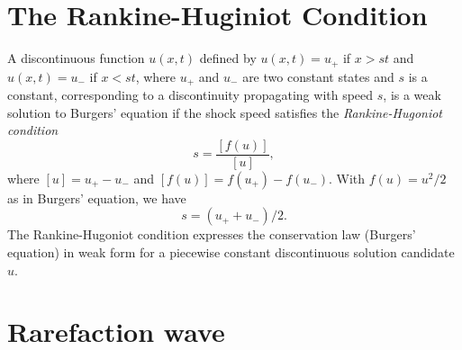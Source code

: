 


\section{The Rankine-Huginiot Condition}

A discontinuous function $u(x,t)$ defined by $u(x,t)=u_+$ if $x>st$ and 
$u(x,t)=u_-$ if $x<st$, where  $u_+$ and $u_-$ are two constant
states and $s$ is a constant, corresponding to a discontinuity 
propagating with speed $s$, is a weak solution
to Burgers' equation if the shock speed satisfies the 
\emph{Rankine-Hugoniot condition}
\begin{equation}\label{rh}
s=\frac{[f(u)]}{[u]},
\end{equation}
where $[u]=u_+-u_-$ and $[f(u)]=f(u_+ )-f(u_- )$. With $f(u)=u^2/2$
as in Burgers' equation, we have 
\begin{equation}\label{rhburgers}
s=(u_++u_-)/2.
\end{equation}
The Rankine-Hugoniot condition expresses the conservation law
(Burgers' equation)
in weak form for a piecewise constant discontinuous solution candidate $u$.


\section{Rarefaction wave}

